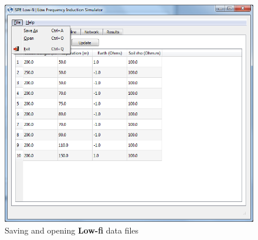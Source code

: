 \documentclass{article}
\begin{document}
\begin{figure}[!htpb]
\begin{center}
\caption{Saving and opening \textbf{Low-fi} data files}
\label{fig:saveload}
\includegraphics[width=0.9\linewidth]{./Figures/RoW_with_file_menu.png}
\end{center}
\end{figure}

\newpage


\end{document}
